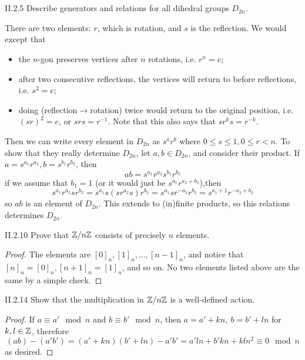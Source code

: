 \section{}

\begin{problem}{II.2.5}
Describe generators and relations for all dihedral groups $D_{2n}$.
\end{problem}
\begin{solution}
There are two elements: $r$, which is rotation, and $s$ is the  reflection. We would except that 
\begin{itemize}
\setlength\itemsep{0pt}
\item the $n$-gon preserves vertices after $n$ rotations, i.e. $r^n= e$;
\item after two consecutive reflections, the vertices will return to before reflections, i.e. $s^2 = e$;
\item doing (reflection$\to$rotation) twice would return to the original position, i.e. $(sr)^2 = e$, or $srs = r^{-1}$. Note that this also says that $sr^ks = r^{-k}$. 
\end{itemize}
Then we can write every element in $D_{2n}$ as $s^ar^b$ where $0 \leq s \leq 1, 0 \leq r < n$. To show that they really determine $D_{2n}$, let $a,b \in D_{2n}$, and consider their product. If $a = s^{a_1}r^{a_2}, b = s^{b_1}r^{b_2}$, then
\[
ab = s^{a_1}r^{a_2}s^{b_1}r^{b_2}
\]
if we assume that $b_1 = 1$ (or it would just be $s^{a_1}r^{a_2+b_2}$),then 
\[
s^{a_1}r^{a_2}sr^{b_2} = s^{a_1}s(sr^{a_2}s)r^{b_2} = s^{a_1}sr^{-a_2}r^{b_2} = s^{a_1+1}r^{-a_2+b_2}
\]
so $ab$ is an element of $D_{2n}$. This extends to (in)finite products, so this relations determines $D_{2n}$.
\end{solution}

\begin{problem}{II.2.10}
Prove that $\mathbb{Z}/n\mathbb{Z}$ consists of precisely $n$ elements.
\end{problem}
\begin{proof}
The elements are $[0]_n, [1]_n, \dotsc, [n-1]_n$, and notice that $[n]_n=[0]_n, [n+1]_n = [1]_n$, and so on. No two elements listed above are the same by a simple check. 
\end{proof}

\begin{problem}{II.2.14}
Show that the multiplication in $\mathbb{Z}/n\mathbb{Z}$ is a well-defined action.
\end{problem}
\begin{proof}
If $a \equiv a' \mod n$ and $b \equiv b' \mod n$, then $a = a' + kn, \: b = b' + ln$ for $k, l \in \mathbb{Z}$, therefore
\[
(ab) - (a'b') = (a' + kn)(b' + ln) - a'b' = a'ln + b'kn + kln^2 \equiv 0 \mod n
\]
as desired.
\end{proof}

